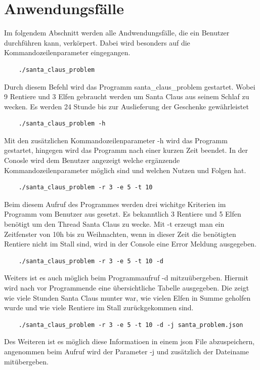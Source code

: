 \documentclass[a4paper,12pt]{article}
\begin{document}
\section{Anwendungsfälle}
Im folgendem Abschnitt werden alle Andwendungsfälle, die ein Benutzer durchführen kann, verkörpert. Dabei wird besonders auf
die Kommandozeilenparameter eingegangen.
\\
\begin{verbatim}
    ./santa_claus_problem
\end{verbatim}
Durch diesem Befehl wird das Programm santa\_claus\_problem gestartet. Wobei 9 Rentiere und 3 Elfen
gebraucht werden um Santa Claus aus seinem Schlaf zu wecken. Es werden 24 Stunde bis zur Auslieferung der Geschenke gewährleistet
\\
\begin{verbatim}
    ./santa_claus_problem -h
\end{verbatim}
Mit den zusätzlichen Kommandozeilenparameter -h wird das Programm gestartet, hingegen wird das Programm
nach einer kurzen Zeit beendet. In der Conosle wird dem Benutzer angezeigt welche ergänzende Kommandozeilenparameter
möglich sind und welchen Nutzen und Folgen hat.
\\
\begin{verbatim}
    ./santa_claus_problem -r 3 -e 5 -t 10
\end{verbatim}
Beim diesem Aufruf des Programmes werden drei wichitge Kriterien im Programm vom Benutzer aus gesetzt.
Es bekanntlich 3 Rentiere und 5 Elfen benötigt um den Thread Santa Claus zu wecke. Mit -t erzeugt man ein Zeitfenster von 10h
bis zu Weihnachten, wenn in dieser Zeit die benötigten Rentiere nicht im Stall sind, wird in der Console eine Error Meldung ausgegeben.
\\
\begin{verbatim}
    ./santa_claus_problem -r 3 -e 5 -t 10 -d
\end{verbatim}
Weiters ist es auch möglich beim Programmaufruf -d mitzuübergeben. Hiermit wird nach vor Programmende
eine übersichtliche Tabelle ausgegeben. Die zeigt wie viele Stunden Santa Claus munter war, wie vielen Elfen in Summe geholfen wurde und wie viele
Rentiere im Stall zurückgekommen sind.
\\
\begin{verbatim}
    ./santa_claus_problem -r 3 -e 5 -t 10 -d -j santa_problem.json
\end{verbatim}
Des Weiteren ist es möglich diese Informatioen in einem json File abzuspeichern, angenommen beim Aufruf wird
der Parameter -j und zusätzlich der Dateiname mitübergeben. 
\\
\end{document}
